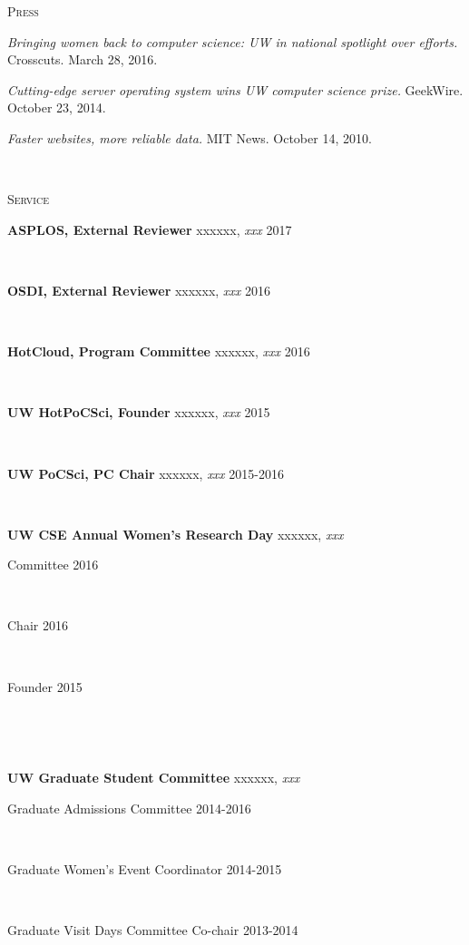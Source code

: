 \documentclass[10pt,times]{report}
\newlength{\sectiongap}
\newlength{\entrygap}
\newlength{\sectioncolwidth}
\newlength{\colgap}
\newlength{\stuffwidth}
\def\ifEqString#1#2{\def\testa{#1}\def\testb{#2}%
  \ifx\testa\testb}
\newenvironment{rtable}{
  \begin{minipage}{\textwidth}
  }{
  \end{minipage}
}
\newenvironment{rentry}[3][xxx]{
  \begin{minipage}[t]{\hsize}
    \textbf{#2}\ifEqString{#1}{xxx}\relax\else, \textit{#1}\fi
    \hspace{\stretch{1}} #3 \\
  }{
    \removelastskip
  \end{minipage}
  \\[\entrygap]  %
}
\newcommand{\rline}[2]{
  \begin{minipage}[t]{\hsize}
    #1 \hspace{\stretch{1}} #2
  \end{minipage} \\
}
\newenvironment{rsection}[1]{
  \begin{minipage}[t]{\sectioncolwidth}
    \textsc{#1}
  \end{minipage}
  \hspace{\colgap}
  \begin{minipage}[t]{\stuffwidth}
  }{
    \removelastskip
  \end{minipage}
  \\[\sectiongap]
}
\begin{document}
\begin{rtable}
  \begin{rsection}{Press}
    \textit{Bringing women back to computer science: UW in national
      spotlight over efforts.} Crosscuts. March 28, 2016.\\\vspace{-0.5em}

    \textit{Cutting-edge server operating system wins UW computer
      science prize.} GeekWire. October 23, 2014.\\\vspace{-0.5em}

    \textit{Faster websites, more reliable data.}
    MIT News. October 14, 2010.\\
  \end{rsection}
  \begin{rsection}{Service}
    \begin{rentry}{ASPLOS, External Reviewer}{2017}
       \vspace{-0.5em}
    \end{rentry}
    \begin{rentry}{OSDI, External Reviewer}{2016}
       \vspace{-0.5em}
    \end{rentry}
    \begin{rentry}{HotCloud, Program Committee}{2016}
       \vspace{-0.5em}
    \end{rentry}
    \begin{rentry}{UW HotPoCSci, Founder}{2015}
       \vspace{-0.5em}
    \end{rentry}
    \begin{rentry}{UW PoCSci, PC Chair}{2015-2016}
       \vspace{-0.5em}
    \end{rentry}
    \begin{rentry}{UW CSE Annual Women's Research Day}{}
      \rline{Committee}{2016}
      \rline{Chair}{2016}
      \rline{Founder}{2015}
       \vspace{-0.5em}
    \end{rentry}
    \begin{rentry}{UW Graduate Student Committee}{}
      \rline{Graduate Admissions Committee}{2014-2016}
      \rline{Graduate Women's Event Coordinator}{2014-2015}
      \rline{Graduate Visit Days Committee Co-chair}{2013-2014}
      \vspace{-0.5em}
    \end{rentry}

\end{rsection}
\end{rtable}
\end{document}
